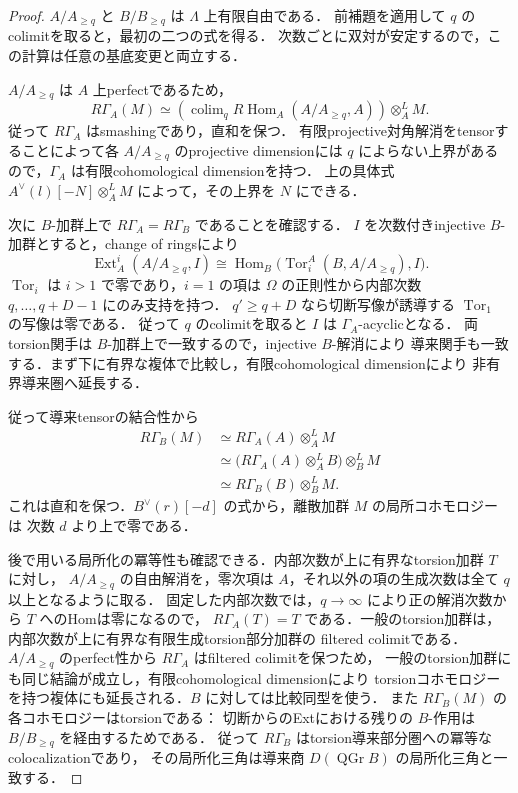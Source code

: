 \begin{proof}
$A/A_{\ge q}$ と $B/B_{\ge q}$ は $\Lambda$ 上有限自由である．
前補題を適用して $q$ のcolimitを取ると，最初の二つの式を得る．
次数ごとに双対が安定するので，この計算は任意の基底変更と両立する．

$A/A_{\ge q}$ は $A$ 上perfectであるため，
\[
 R\Gamma_A(M)
 \simeq\left(\mathop{\mathrm{colim}}_q
 R\!\operatorname{Hom}_A(A/A_{\ge q},A)\right)\otimes_A^L M.
\]
従って $R\Gamma_A$ はsmashingであり，直和を保つ．
有限projective対角解消をtensorすることによって各 $A/A_{\ge q}$ のprojective dimensionには
$q$ によらない上界があるので，$\Gamma_A$ は有限cohomological dimensionを持つ．
上の具体式 $A^\vee(l)[-N]\otimes_A^LM$ によって，その上界を $N$ にできる．

次に $B$-加群上で $R\Gamma_A=R\Gamma_B$ であることを確認する．
$I$ を次数付きinjective $B$-加群とすると，change of ringsにより
\[
 \operatorname{Ext}^i_A(A/A_{\ge q},I)
 \cong\operatorname{Hom}_B
   \bigl(\operatorname{Tor}_i^A(B,A/A_{\ge q}),I\bigr).
\]
$\operatorname{Tor}_i$ は $i>1$ で零であり，$i=1$ の項は
$\Omega$ の正則性から内部次数 $q,\ldots,q+D-1$ にのみ支持を持つ．
$q'\ge q+D$ なら切断写像が誘導する $\operatorname{Tor}_1$ の写像は零である．
従って $q$ のcolimitを取ると $I$ は $\Gamma_A$-acyclicとなる．
両torsion関手は $B$-加群上で一致するので，injective $B$-解消により
導来関手も一致する．まず下に有界な複体で比較し，有限cohomological dimensionにより
非有界導来圏へ延長する．

従って導来tensorの結合性から
\begin{align*}
 R\Gamma_B(M)
 &\simeq R\Gamma_A(A)\otimes_A^L M\\
 &\simeq\bigl(R\Gamma_A(A)\otimes_A^L B\bigr)\otimes_B^L M\\
 &\simeq R\Gamma_B(B)\otimes_B^L M.
\end{align*}
これは直和を保つ．$B^\vee(r)[-d]$ の式から，離散加群 $M$ の局所コホモロジーは
次数 $d$ より上で零である．

後で用いる局所化の冪等性も確認できる．内部次数が上に有界なtorsion加群 $T$ に対し，
$A/A_{\ge q}$ の自由解消を，零次項は $A$，それ以外の項の生成次数は全て $q$ 以上となるように取る．
固定した内部次数では，$q\to\infty$ により正の解消次数から $T$ へのHomは零になるので，
$R\Gamma_A(T)=T$ である．一般のtorsion加群は，内部次数が上に有界な有限生成torsion部分加群の
filtered colimitである．$A/A_{\ge q}$ のperfect性から $R\Gamma_A$ はfiltered colimitを保つため，
一般のtorsion加群にも同じ結論が成立し，有限cohomological dimensionにより
torsionコホモロジーを持つ複体にも延長される．$B$ に対しては比較同型を使う．
また $R\Gamma_B(M)$ の各コホモロジーはtorsionである：
切断からのExtにおける残りの $B$-作用は $B/B_{\ge q}$ を経由するためである．
従って $R\Gamma_B$ はtorsion導来部分圏への冪等なcolocalizationであり，
その局所化三角は導来商 $D(\operatorname{QGr}B)$ の局所化三角と一致する．
\end{proof}

